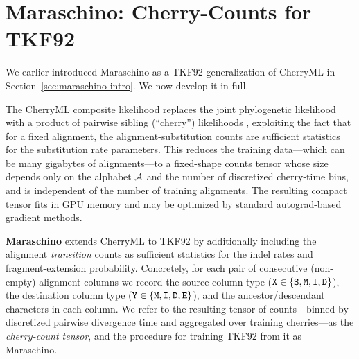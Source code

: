 \section{Maraschino: Cherry-Counts for TKF92}
\label{sec:maraschino-main}

We earlier introduced Maraschino as a TKF92 generalization of CherryML
in Section~\ref{sec:maraschino-intro}.  We now develop it in full.

The CherryML composite likelihood replaces the joint phylogenetic
likelihood with a product of pairwise sibling (``cherry'') likelihoods
\cite{Prillo2022CherryML}, exploiting the fact that for a fixed alignment,
the alignment-substitution counts are sufficient statistics for the
substitution rate parameters.  This reduces the training data---which can
be many gigabytes of alignments---to a fixed-shape counts tensor whose
size depends only on the alphabet $\mathcal{A}$ and the number of
discretized cherry-time bins, and is independent of the number of
training alignments.  The resulting compact tensor fits in GPU memory
and may be optimized by standard autograd-based gradient methods.

\textbf{Maraschino} extends CherryML to TKF92 by additionally including
the alignment \emph{transition} counts as sufficient statistics for the
indel rates and fragment-extension probability.  Concretely, for each
pair of consecutive (non-empty) alignment columns we record the
source column type (${\tt X} \in \{{\tt S},{\tt M},{\tt I},{\tt D}\}$),
the destination column type (${\tt Y} \in \{{\tt M},{\tt I},{\tt D},{\tt E}\}$),
and the ancestor/descendant characters in each column. We refer to
the resulting tensor of counts---binned by discretized pairwise
divergence time and aggregated over training cherries---as the
\emph{cherry-count tensor}, and the procedure for training TKF92 from
it as Maraschino.

